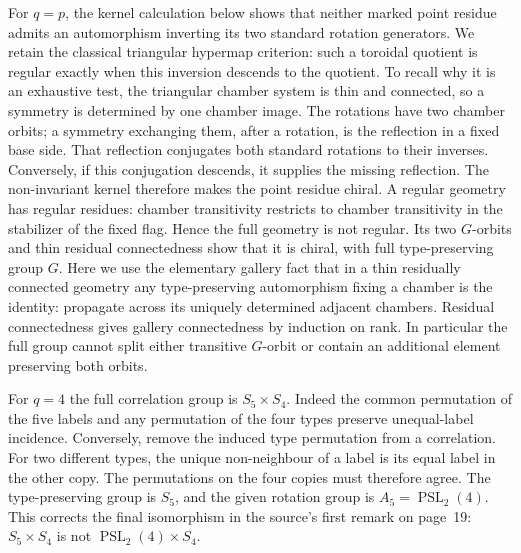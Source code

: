 For $q=p$, the kernel calculation below shows that neither
marked point residue admits an automorphism inverting its two
standard rotation generators. We retain the classical triangular
hypermap criterion: such a toroidal quotient is regular exactly
when this inversion descends to the quotient. To recall why it
is an exhaustive test, the triangular chamber system is thin and
connected, so a symmetry is determined by one chamber image.
The rotations have two chamber orbits; a symmetry exchanging
them, after a rotation, is the reflection in a fixed base side.
That reflection conjugates both standard rotations to their
inverses. Conversely, if this conjugation descends, it supplies
the missing reflection. The non-invariant kernel therefore makes
the point residue chiral. A regular geometry has regular residues:
chamber transitivity restricts to chamber transitivity in the
stabilizer of the fixed flag. Hence the full geometry is not
regular. Its two $G$-orbits and thin residual connectedness show
that it is chiral, with full type-preserving group $G$.
Here we use the elementary gallery fact that in a thin residually
connected geometry any type-preserving automorphism fixing a
chamber is the identity: propagate across its uniquely determined
adjacent chambers. Residual connectedness gives gallery
connectedness by induction on rank. In particular the full group
cannot split either transitive $G$-orbit or contain an additional
element preserving both orbits.

For $q=4$ the full correlation group is $S_5\times S_4$.
Indeed the common permutation of the five labels and any
permutation of the four types preserve unequal-label incidence.
Conversely, remove the induced type permutation from a correlation.
For two different types, the unique non-neighbour of a label is
its equal label in the other copy. The permutations on the four
copies must therefore agree. The type-preserving group is $S_5$,
and the given rotation group is $A_5=\operatorname{PSL}_2(4)$.
This corrects the final isomorphism in the source's first remark
on page~19: $S_5\times S_4$ is not
$\operatorname{PSL}_2(4)\times S_4$.
